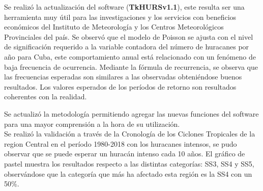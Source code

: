 \begin{conclusions}

Se realizó la actualización del software (\textbf{TkHURSv1.1}), este resulta ser una herramienta muy útil para las investigaciones y los servicios con beneﬁcios económicos  del Instituto de Meteorología y los Centros Meteorológicos Provinciales del país. Se observó que el modelo de Poisson se ajusta con el nivel de signiﬁcación requerido a la variable contadora del número de huracanes por año para Cuba, este comportamiento anual está relacionado con un fenómeno de baja frecuencia de ocurrencia. Mediante la fórmula de recurrencia, se observa que las frecuencias esperadas son similares a las observadas obteniéndose buenos resultados. Los valores esperados de los períodos de retorno son resultados coherentes con la realidad.


Se actualizó la metodología permitiendo agregar las nuevas funciones del software para una mayor comprensión a la hora de su utilización.\\  
Se realizó la validación a través de la Cronología de los Ciclones Tropicales de la region Central en el período 1980-2018 con los huracanes intensos, se pudo observar que se puede esperar un huracán intenso cada 10 años.
El gráﬁco de pastel muestra los resultados respecto a las distintas categorías: SS3, SS4 y SS5, observándose que la categoría que más ha afectado esta región es la SS4 con un 50\%.


\end{conclusions}
